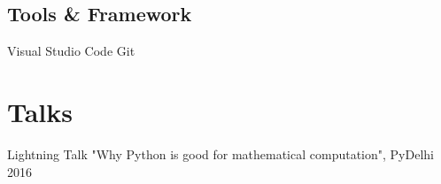 \documentclass[]{deedy-resume-openfont}
\begin{document}
\begin{minipage}[t]{0.33\textwidth}
\subsection{Tools \& Framework}
\textbullet{} Visual Studio Code \textbullet{} Git
\sectionsep


\section{Talks}
\textbullet{} Lightning Talk "Why Python is good for mathematical computation", PyDelhi 2016 \\
\sectionsep

%
%

\end{minipage}
\hfill
\end{document}
